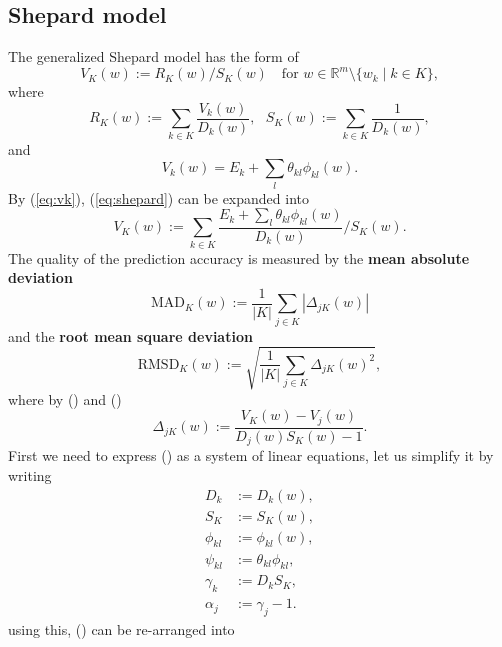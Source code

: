 \documentclass[12pt]{article}
\def\D{\displaystyle}
\begin{document}
\subsection{Shepard model}
\label{subsec:shepard}
The generalized Shepard model has the form of 
\begin{equation}
	\label{eq:shepard}
	V_K(w):=R_K(w)/S_K(w) ~~~ \text{ for } w \in \mathbb{R}^m \setminus \{w_k\mid k\in K \},
\end{equation}
where
\begin{equation}
	R_K(w):=\sum_{k\in K} \frac{V_k(w)}{D_k(w)},~~~
	S_K(w):=\sum_{k\in K} \frac{1}{D_k(w)},
\end{equation}
and
\begin{equation}
	\label{eq:vk}
	V_k(w) = E_k + \sum_l \theta_{kl} \phi_{kl}(w).
\end{equation}
By (\ref{eq:vk}), (\ref{eq:shepard}) can be expanded into
\begin{equation}
	\label{eq:vk_expand}
	V_K(w) := \sum_{k\in K} \frac{E_k + \sum_l \theta_{kl} \phi_{kl}(w)}{D_k(w)} / S_K(w). 
\end{equation}
The quality of the prediction accuracy is measured by the \textbf{mean absolute deviation}
\begin{equation}
	\text{MAD}_K(w) := \frac{1}{|K|}\sum_{j\in K}|\Delta_{jK}(w)|
\end{equation}
and the \textbf{root mean square deviation}
\begin{equation}
	\text{RMSD}_K(w) := \sqrt{\frac{1}{|K|}\sum_{j\in K}\Delta_{jK}(w)^2},
\end{equation}
where by () and ()
\begin{equation}
	\label{eq:delta}
	\Delta_{jK}(w):=\D\frac{V_K(w)-V_j(w)}{D_j(w)S_K(w)-1}.
\end{equation}
First we need to express () as a system of linear equations, let us simplify it by writing
\begin{equation*}
	\label{eq:simp}
	\begin{split}
		D_k &:= D_k(w), \\
		S_K &:= S_K(w), \\
		\phi_{kl} &:= \phi_{kl}(w),\\
		\psi_{kl} &:= \theta_{kl}\phi_{kl}, \\
		\gamma_k &:= D_kS_K, \\
		\alpha_j &:= \gamma_j-1.
	\end{split}
\end{equation*}
using this, () can be re-arranged into
\end{document}
